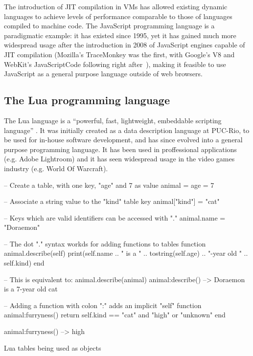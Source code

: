 The introduction of JIT compilation in VMs has allowed existing dynamic
languages to achieve levels of performance comparable to those of languages
compiled to machine code. The JavaScript
programming language is a paradigmatic example: it has existed since 1995, yet
it has gained much more widespread usage after the introduction in 2008 of
JavaScript engines capable of JIT compilation (Mozilla's TraceMonkey was the
first, with Google's V8 and WebKit's JavaScriptCode following right
after~\cite{js-raceforspeed}), making it feasible to use JavaScript as
a general purpose language outside of web browsers.


\subsection{The Lua programming language}
	\label{sec:lua-programming-lang}

The Lua language is a “powerful, fast, lightweight, embeddable scripting
language” \cite{lua-about}. It was initially created as a data description
language at \gls{PUC-Rio}, to be used for in-house software development, and
has since evolved into a general purpose programming language. It has been
used in proffessional applications (e.g. Adobe Lightroom) and it has seen
widespread usage in the video games industry (e.g. World Of Warcraft).


\begin{listing}
  \begin{luacode}
    -- Create a table, with one key, "age" and 7 as value
    animal = { age = 7 }

    -- Associate a string value to the "kind" table key
    animal["kind"] = "cat"

    -- Keys which are valid identifiers can be accessed with "."
    animal.name = "Doraemon"

    -- The dot "." syntax workds for adding functions to tables
    function animal.describe(self)
      print(self.name .. " is a " .. tostring(self.age) ..
            "-year old " .. self.kind)
    end

    -- This is equivalent to: animal.describe(animal)
    animal:describe()  --> Doraemon is a 7-year old cat

    -- Adding a function with colon ":" adds an implicit "self"
    function animal:furryness()
      return self.kind == "cat" and "high" or "unknown"
    end

    animal:furryness()  --> high
  \end{luacode}
	\caption{Lua tables being used as objects}
  \label{lst:lua-example-tables}
\end{listing}

